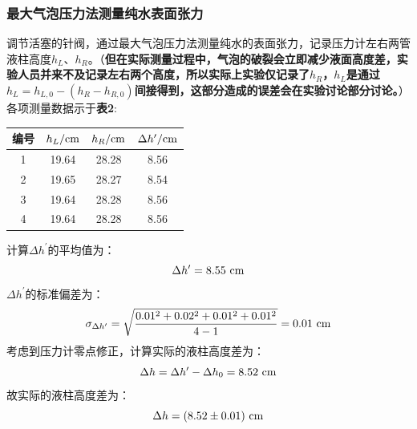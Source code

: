 \documentclass[12pt]{article}
\begin{document}
			\subsubsection{最大气泡压力法测量纯水表面张力}
			调节活塞的针阀，通过最大气泡压力法测量纯水的表面张力，记录压力计左右两管液柱高度$h_{L}$、$h_{R}$。（\textbf{但在实际测量过程中，气泡的破裂会立即减少液面高度差，实验人员并来不及记录左右两个高度，所以实际上实验仅记录了$h_{R}$，$h_{L}$是通过$h_{L}=h_{L,0}-(h_{R}-h_{R,0})$间接得到，这部分造成的误差会在实验讨论部分讨论。}）各项测量数据示于\textbf{表2}:\par
			\begin{table}[h]
				\centering
				\begin{tabular}{cccc}
					\toprule
					编号 & $h_{L}/{\rm cm}$ & $h_{R}/{\rm cm}$ & $\Delta h^{\prime}/{\rm cm}$ \\
					\midrule
					1 & 19.64 & 28.28 & 8.56 \\
					2 & 19.65 & 28.27 & 8.54\\
					3 & 19.64 & 28.28 & 8.56\\
					4 & 19.64 & 28.28 & 8.56\\
					\bottomrule
				\end{tabular}
			\end{table}
			计算$\Delta h^{\prime}$的平均值为：
				$$
				\Delta h^{\prime}=8.55\ {\rm cm}
				$$
			$\Delta h^{\prime}$的标准偏差为：
				$$
				\sigma_{\Delta h^{\prime}}=\sqrt{\frac{0.01^{2}+0.02^{2}+0.01^{2}+0.01^{2}}{4-1}}=0.01\ {\rm cm}
				$$
			考虑到压力计零点修正，计算实际的液柱高度差为：
				$$
				\Delta h=\Delta h^{\prime}-\Delta h_{0}=8.52\ {\rm cm}
				$$
			故实际的液柱高度差为：
				$$
				\Delta h=(8.52\pm 0.01)\ {\rm cm}
				$$
			
\end{document}
